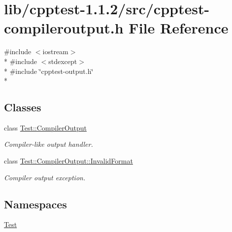\hypertarget{cpptest-compileroutput_8h}{}\section{lib/cpptest-\/1.1.2/src/cpptest-\/compileroutput.h File Reference}
\label{cpptest-compileroutput_8h}
{\ttfamily \#include $<$iostream$>$}\\*
{\ttfamily \#include $<$stdexcept$>$}\\*
{\ttfamily \#include \char`\"{}cpptest-\/output.\+h\char`\"{}}\\*
\subsection*{Classes}
\begin{DoxyCompactItemize}
\item 
class \hyperlink{class_test_1_1_compiler_output}{Test\+::\+Compiler\+Output}
\begin{DoxyCompactList}\small\item\em Compiler-\/like output handler. \end{DoxyCompactList}\item 
class \hyperlink{class_test_1_1_compiler_output_1_1_invalid_format}{Test\+::\+Compiler\+Output\+::\+Invalid\+Format}
\begin{DoxyCompactList}\small\item\em Compiler output exception. \end{DoxyCompactList}\end{DoxyCompactItemize}
\subsection*{Namespaces}
\begin{DoxyCompactItemize}
\item 
 \hyperlink{namespace_test}{Test}
\end{DoxyCompactItemize}

